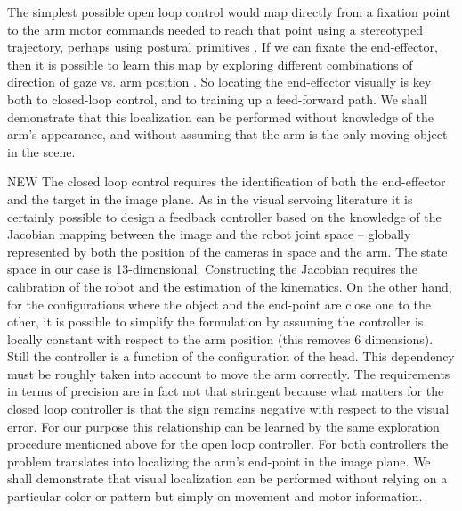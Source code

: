 The simplest possible open loop control would map directly from a
fixation point to the arm motor commands needed to reach that point
\cite{metta99developmental} using a stereotyped trajectory, perhaps
using postural primitives \cite{mussa-ivaldi92vector}.  If we can
fixate the end-effector, then it is possible to learn this map by
exploring different combinations of direction of gaze vs.  arm
position \cite{Marjanovic-96-SAB,metta99developmental}.  So locating
the end-effector visually is key both to closed-loop control, and to
training up a feed-forward path.  We shall demonstrate that this
localization can be performed without knowledge of the arm's appearance,
and without assuming that the arm is the only moving object in the
scene.

\ifverbose
NEW The closed loop control requires the identification of both the
end-effector and the target in the image plane. As in the visual
servoing literature \cite{espiau92new} it is certainly possible to
design a feedback controller based on the knowledge of the Jacobian
mapping between the image and the robot joint space -- globally
represented by both the position of the cameras in space and the arm.
The state space in our case is 13-dimensional. Constructing the
Jacobian requires the calibration of the robot and the estimation of
the kinematics.  On the other hand, for the configurations where the
object and the end-point are close one to the other, it is possible to
simplify the formulation by assuming the controller is locally
constant with respect to the arm position (this removes 6 dimensions).
Still the controller is a function of the configuration of the head.
This dependency must be roughly taken into account to move the arm
correctly. The requirements in terms of precision are in fact not that
stringent because what matters for the closed loop controller is that
the sign remains negative with respect to the visual error. For our
purpose this relationship can be learned by the same exploration
procedure mentioned above for the open loop controller.  For both
controllers the problem translates into localizing the arm's end-point
in the image plane. We shall demonstrate that visual localization can
be performed without relying on a particular color or pattern but
simply on movement and motor information.
\fi

